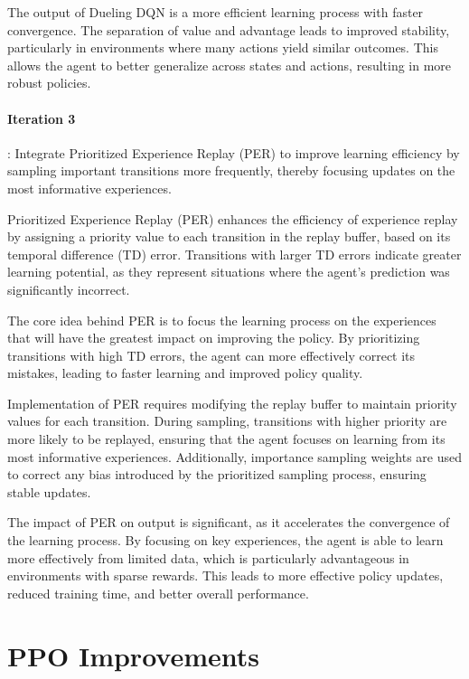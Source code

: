 \documentclass[
12pt, %
oneside, %
english, %
onehalfspacing, %
nolistspacing, %
liststotoc, %
headsepline, %
]{ProposalAndThesis} %
\begin{document}
The output of Dueling DQN is a more efficient learning process with faster convergence. The separation of value and advantage leads to improved stability, particularly in environments where many actions yield similar outcomes. This allows the agent to better generalize across states and actions, resulting in more robust policies.

\paragraph{Iteration 3}: Integrate Prioritized Experience Replay (PER) to improve learning efficiency by sampling important transitions more frequently, thereby focusing updates on the most informative experiences.

    Prioritized Experience Replay (PER) enhances the efficiency of experience replay by assigning a priority value to each transition in the replay buffer, based on its temporal difference (TD) error. Transitions with larger TD errors indicate greater learning potential, as they represent situations where the agent's prediction was significantly incorrect.

    The core idea behind PER is to focus the learning process on the experiences that will have the greatest impact on improving the policy. By prioritizing transitions with high TD errors, the agent can more effectively correct its mistakes, leading to faster learning and improved policy quality.

    Implementation of PER requires modifying the replay buffer to maintain priority values for each transition. During sampling, transitions with higher priority are more likely to be replayed, ensuring that the agent focuses on learning from its most informative experiences. Additionally, importance sampling weights are used to correct any bias introduced by the prioritized sampling process, ensuring stable updates.

    The impact of PER on output is significant, as it accelerates the convergence of the learning process. By focusing on key experiences, the agent is able to learn more effectively from limited data, which is particularly advantageous in environments with sparse rewards. This leads to more effective policy updates, reduced training time, and better overall performance.

\section{PPO Improvements}
\end{document}
